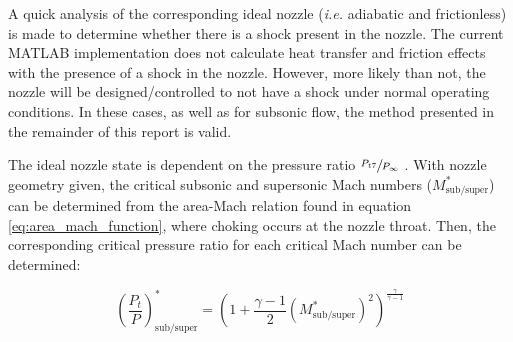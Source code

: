 \documentclass{article}
\begin{document}
A quick analysis of the corresponding ideal nozzle (\textit{i.e.} adiabatic and frictionless) is made to determine whether there is a shock present in the nozzle. The current MATLAB implementation does not calculate heat transfer and friction effects with the presence of a shock in the nozzle. However, more likely than not, the nozzle will be designed/controlled to not have a shock under normal operating conditions. In these cases, as well as for subsonic flow, the method presented in the remainder of this report is valid.

The ideal nozzle state is dependent on the pressure ratio $\sfrac{P_{t7}}{P_{\infty}}$ \cite{cantwell210}. With nozzle geometry given, the critical subsonic and supersonic Mach numbers ($M_{\textrm{sub/super}}^*$) can be determined from the area-Mach relation found in equation \ref{eq:area_mach_function}, where choking occurs at the nozzle throat. Then, the corresponding critical pressure ratio for each critical Mach number can be determined:

\begin{equation}
\left( \frac{P_t}{P} \right)_{\textrm{sub/super}}^* = \left( 1 + \frac{\gamma - 1}{2} \left(M_{\textrm{sub/super}}^*\right)^2 \right)^\frac{\gamma}{\gamma - 1}
\end{equation}
\end{document}
